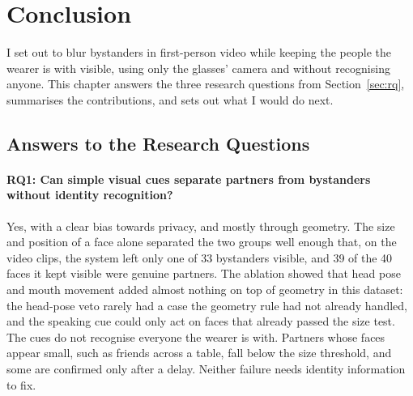 \section{Conclusion}
\label{sec:conclusion}

I set out to blur bystanders in first-person video while keeping the people the wearer is
with visible, using only the glasses' camera and without recognising anyone. This chapter
answers the three research questions from Section~\ref{sec:rq}, summarises the
contributions, and sets out what I would do next.

\subsection{Answers to the Research Questions}

\paragraph{RQ1: Can simple visual cues separate partners from bystanders without
identity recognition?}
Yes, with a clear bias towards privacy, and mostly through geometry. The size and position
of a face alone separated the two groups well enough that, on the video clips, the system
left only one of 33 bystanders visible, and 39 of the 40 faces it kept visible were genuine
partners. The ablation showed that head pose and mouth movement added almost nothing on top
of geometry in this dataset: the head-pose veto rarely had a case the geometry rule had not
already handled, and the speaking cue could only act on faces that already passed the size
test. The cues do not recognise everyone the wearer is with. Partners whose faces appear
small, such as friends across a table, fall below the size threshold, and some are
confirmed only after a delay. Neither failure needs identity information to fix.

